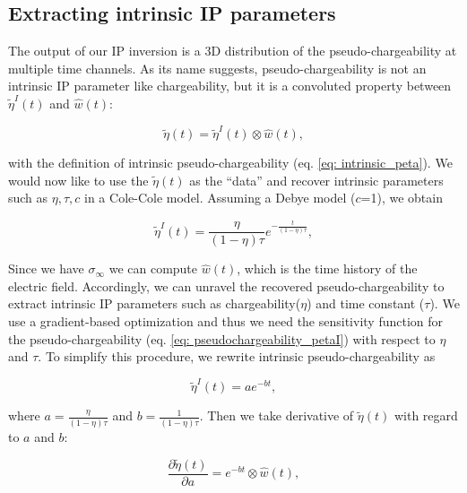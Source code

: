 \documentclass[letterpaper,11pt]{article}
\newcommand{\siginf}{\sigma_\infty}
\newcommand{\peta}{\tilde{\eta}}
\begin{document}
\subsection{Extracting intrinsic IP parameters}
\label{appendix: extract_intrinsicIP}
The output of our IP inversion is a 3D distribution of the pseudo-chargeability at multiple time channels. 
As its name suggests, pseudo-chargeability is not an intrinsic IP parameter like chargeability, but it is a convoluted property between $\peta^{I}(t)$ and $\hat{w}(t)$:
\begin{linenomath*}
\begin{equation}
  \peta(t) = \peta^{I}(t) \otimes \hat{w}(t),
  \label{eq: pseudochargeability_petaI}
\end{equation}
\end{linenomath*}
with the definition of intrinsic pseudo-chargeability (eq. \ref{eq: intrinsic_peta}).
We would now like to use the $\peta(t)$ as the “data” and recover intrinsic parameters such as $\eta, \tau, c$ in a Cole-Cole model. Assuming a Debye model ($c$=1), we obtain
\begin{linenomath*}
\begin{equation}
    \peta^{I}(t) = \frac{\eta}{(1-\eta)\tau}e^{-\frac{t}{(1-\eta)\tau}},
    \label{eq: intrinsic_peta_debye}
\end{equation}
\end{linenomath*}
Since we have $\siginf$ we can compute $\hat{w}(t)$, which is the time history of the electric field. 
Accordingly, we can unravel the recovered pseudo-chargeability to extract intrinsic IP parameters such as chargeability($\eta$) and time constant ($\tau$). 
We use a gradient-based optimization and thus we need the sensitivity function for the pseudo-chargeability (eq. \ref{eq: pseudochargeability_petaI}) with respect to $\eta$ and $\tau$. 
To simplify this procedure, we rewrite intrinsic pseudo-chargeability as 
\begin{linenomath*}
\begin{equation}
  \peta^{I}(t) = a e^{-bt},
\end{equation}
\end{linenomath*}
where $a = \frac{\eta}{(1-\eta)\tau}$ and $b = \frac{1}{(1-\eta)\tau}$. 
Then we take derivative of $\peta(t)$ with regard to $a$ and $b$:
\begin{linenomath*}
\begin{equation}
  \frac{\partial \peta(t)}{\partial a} = e^{-bt} \otimes \hat{w}(t),
\end{equation}
\end{linenomath*}
\end{document}
